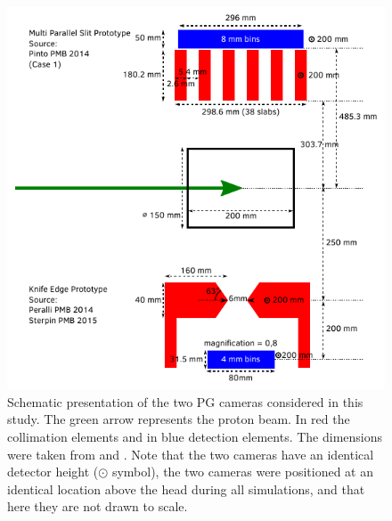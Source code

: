 \documentclass[a4paper,english,12pt]{article}
\begin{document}
\begin{figure}[htp]
  \centering
  \includegraphics[width=0.8\linewidth]{detectors_cyl}
  \caption{Schematic presentation of the two PG cameras considered in this study. The green arrow represents the proton beam. In red the collimation elements and in blue detection elements. The dimensions were taken from \cite{Pinto2014a} and \cite{Perali2014,Sterpin2015}. Note that the two cameras have an identical detector height ($\odot$ symbol), the two cameras were positioned at an identical location above the head during all simulations, and that here they are not drawn to scale.}
  \label{fig:detectors}
\end{figure}
\end{document}

